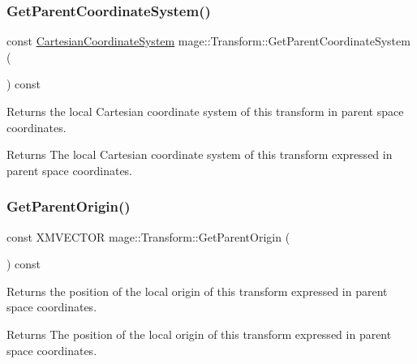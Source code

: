 \subsubsection{\texorpdfstring{Get\+Parent\+Coordinate\+System()}{GetParentCoordinateSystem()}}
{\footnotesize\ttfamily const \hyperlink{structmage_1_1_cartesian_coordinate_system}{Cartesian\+Coordinate\+System} mage\+::\+Transform\+::\+Get\+Parent\+Coordinate\+System (\begin{DoxyParamCaption}{ }\end{DoxyParamCaption}) const\hspace{0.3cm}{\ttfamily [noexcept]}}

Returns the local Cartesian coordinate system of this transform in parent space coordinates.

\begin{DoxyReturn}{Returns}
The local Cartesian coordinate system of this transform expressed in parent space coordinates. 
\end{DoxyReturn}
\hypertarget{structmage_1_1_transform_ac15f904c1b365583513a8827c483ff21}{}\label{structmage_1_1_transform_ac15f904c1b365583513a8827c483ff21} 
\subsubsection{\texorpdfstring{Get\+Parent\+Origin()}{GetParentOrigin()}}
{\footnotesize\ttfamily const X\+M\+V\+E\+C\+T\+OR mage\+::\+Transform\+::\+Get\+Parent\+Origin (\begin{DoxyParamCaption}{ }\end{DoxyParamCaption}) const\hspace{0.3cm}{\ttfamily [noexcept]}}

Returns the position of the local origin of this transform expressed in parent space coordinates.

\begin{DoxyReturn}{Returns}
The position of the local origin of this transform expressed in parent space coordinates. 
\end{DoxyReturn}
\hypertarget{structmage_1_1_transform_afbe8535cd6616d92d1107c6baff78125}{}\label{structmage_1_1_transform_afbe8535cd6616d92d1107c6baff78125} 
